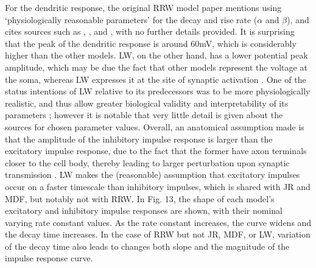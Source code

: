 \documentclass[12pt,twoside]{article}
\begin{document}
For the dendritic response, the original RRW model paper \citep{robinson1997propagation} mentions using `physiologically reasonable parameters' for the decay and rise rate ($\alpha$ and $\beta$), and cites sources such as \citet{freeman1991induced}, \citet{lopes1974model}, and \citet{van1982model}, with no further details provided. It is surprising that the peak of the dendritic response is around 60mV, which is considerably higher than the other models. LW, on the other hand, has a lower potential peak amplitude, which may be due the fact that other models represent the voltage at the soma, whereas LW expresses it at the site of synaptic activation \citep{liley2001spatially}. One of the status intentions of LW relative to its predecessors was to be more physiologically realistic, and thus allow greater biological validity and interpretability of its parameters \citep{liley2001spatially}; however it is notable that very little detail is given about the sources for chosen parameter values. %
Overall, an anatomical assumption made is that the amplitude of the inhibitory impulse response is larger than the excitatory impulse response, due to the fact that the former have axon terminals closer to the cell body, thereby leading to larger perturbation upon synaptic transmission \citep{kandel2000principles,cook2021neural}. LW makes the (reasonable) assumption that excitatory impulses occur on a faster timescale than inhibitory impulses, which is shared with JR and MDF, but notably not with RRW. In Fig. 13, the shape of each model's excitatory and inhibitory impulse responses are shown, with their nominal varying rate constant values. As the rate constant increases, the curve widens and the decay time increases. In the case of RRW but not JR, MDF, or LW, variation of the decay time also leads to changes both slope and the magnitude of the impulse response curve.

\vspace{-0.1cm}

\newline
\end{document}
